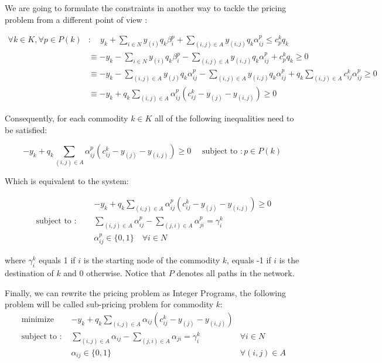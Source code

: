 We are going to formulate the constraints in another way to tackle the pricing problem from a different point of view :

\begin{equation}\begin{aligned}
\forall k \in K, \forall p \in P(k) &: \quad y_{k}+\sum_{i \in N} y_{(i)} q_{k} \beta_{i}^{p}+\sum_{(i, j) \in A} y_{(i, j)} q_{k} \alpha_{i j}^{p} \leq c_{p}^{k} q_{k} \\
& \equiv-y_{k}-\sum_{i \in N} y_{(i)} q_{k} \beta_{i}^{p}-\sum_{(i, j) \in A} y_{(i, j)} q_{k} \alpha_{i j}^{p}+c_{p}^{k} q_{k} \geq 0 \\
& \equiv-y_{k}-\sum_{(i, j) \in A} y_{(j)} q_{k} \alpha_{i j}^{p}-\sum_{(i, j) \in A} y_{(i, j)} q_{k} \alpha_{i j}^{p}+q_{k} \sum_{(i, j) \in A} c_{i j}^{k} \alpha_{i j}^{p} \geq 0 \\
& \equiv-y_{k}+q_{k} \sum_{(i, j) \in A} \alpha_{i j}^{p}\left(c_{i j}^{k}-y_{(j)}-y_{(i, j)}\right) \geq 0
\end{aligned}\end{equation}

Consequently, for each commodity $k \in K$ all of the following inequalities need to be satisfied:

\begin{equation}-y_{k}+q_{k} \sum_{(i, j) \in A} \alpha_{i j}^{p}\left(c_{i j}^{k}-y_{(j)}-y_{(i, j)}\right) \geq 0 \quad \text { subject to }: p \in P(k)\end{equation}

Which is equivalent to the system:

\begin{align}
&-y_{k}+q_{k} \sum_{(i, j) \in A} \alpha_{i j}^{p}\left(c_{i j}^{k}-y_{(j)}-y_{(i, j)}\right) \geq 0 \\
\text { subject to : } \quad &\sum_{(i, j) \in A} \alpha_{i j}^{p}-\sum_{(j, i) \in A} \alpha_{j i}^{p}=\gamma_{i}^{k} \\
&\alpha_{i j}^{p} \in\{0,1\} \quad \forall i \in N
\end{align}

where $\gamma_{i}^{k}$ equals 1 if $i$ is the starting node of the commodity $k$, equals -1 if $i$ is the destination of $k$ and 0 otherwise. Notice that $P$ denotes all paths in the network.


Finally, we can rewrite the pricing problem as Integer Programs, the following problem will be called sub-pricing problem for commodity $k$:
\begin{equation}\begin{array}{lll}
\text { minimize } & -y_{k}+q_{k} \sum_{(i, j) \in A} \alpha_{i j}\left(c_{i j}^{k}-y_{(j)}-y_{(i, j)}\right) \\
\text { subject to : } & \sum_{(i, j) \in A} \alpha_{i j}-\sum_{(j, i) \in A} \alpha_{j i}=\gamma_{i}^{k} & \forall i \in N \\
& \alpha_{i j} \in\{0,1\} & \forall(i, j) \in A
\end{array}\end{equation}

